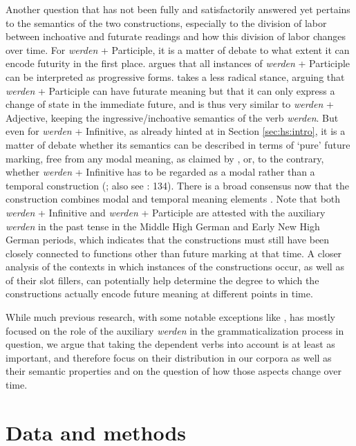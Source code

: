 \documentclass[output=paper,colorlinks,citecolor=brown]{langscibook}
\begin{document}
Another question that has not been fully and satisfactorily answered yet pertains to the semantics of the two constructions, especially to the division of labor between inchoative and futurate readings and how this division of labor changes over time. For \textit{werden} + Participle, it is a matter of debate to what extent it can encode futurity in the first place. \citet[385]{Welke2005} argues that all instances of \textit{werden} + Participle can be interpreted as progressive forms. \citet[325--326]{pfefferkornPeriphrastischenFuturformenIm2005} takes a less radical stance, arguing that \textit{werden} + Participle can have futurate meaning but that it can only express a change of state in the immediate future, and is thus very similar to \textit{werden} + Adjective, keeping the ingressive/inchoative semantics of the verb \textit{werden}. But even for \textit{werden} + Infinitive, as already hinted at in Section \ref{sec:hs:intro}, it is a matter of debate whether its semantics can be described in terms of `pure' future marking, free from any modal meaning, as claimed by \citet[132]{dalKurzeDeutscheSyntax1962}, or, to the contrary, whether \textit{werden} + Infinitive has to be regarded as a modal rather than a temporal construction (\cite{vater1975}; also see \cite{Heine1995}: 134). There is a broad consensus now that the construction combines modal and temporal meaning elements \citep[see][154]{Hilpert2008}.  Note that both \textit{werden} + Infinitive and \textit{werden} + Participle are attested with the auxiliary \textit{werden} in the past tense in the Middle High German and Early New High German periods, which indicates that the constructions must still have been closely connected to functions other than future marking at that time. A closer analysis of the contexts in which instances of the constructions occur, as well as of their slot fillers, can potentially help determine the degree to which the constructions actually encode future meaning at different points in time.

While much previous research, with some notable exceptions like \citep[][]{Hilpert2008}, has mostly focused on the role of the auxiliary \textit{werden} in the grammaticalization process in question, we argue that taking the dependent verbs into account is at least as important, and therefore focus on their distribution in our corpora as well as their semantic properties and on the question of how those aspects change over time. 
 


\section{Data and methods} \label{sec:hs:dataandmethods}
\end{document}
